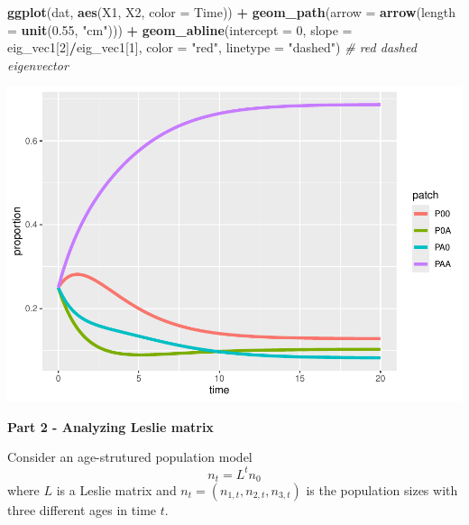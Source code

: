 \documentclass[
]{book}
\newenvironment{Shaded}{\begin{snugshade}}{\end{snugshade}}
\newcommand{\AttributeTok}[1]{\textcolor[rgb]{0.13,0.29,0.53}{#1}}
\newcommand{\CommentTok}[1]{\textcolor[rgb]{0.56,0.35,0.01}{\textit{#1}}}
\newcommand{\DecValTok}[1]{\textcolor[rgb]{0.00,0.00,0.81}{#1}}
\newcommand{\FloatTok}[1]{\textcolor[rgb]{0.00,0.00,0.81}{#1}}
\newcommand{\FunctionTok}[1]{\textcolor[rgb]{0.13,0.29,0.53}{\textbf{#1}}}
\newcommand{\NormalTok}[1]{#1}
\newcommand{\SpecialCharTok}[1]{\textcolor[rgb]{0.81,0.36,0.00}{\textbf{#1}}}
\newcommand{\StringTok}[1]{\textcolor[rgb]{0.31,0.60,0.02}{#1}}
\begin{document}
\begin{Shaded}
\begin{Highlighting}[]
\FunctionTok{ggplot}\NormalTok{(dat, }\FunctionTok{aes}\NormalTok{(X1, X2, }\AttributeTok{color =}\NormalTok{ Time)) }\SpecialCharTok{+}
  \FunctionTok{geom\_path}\NormalTok{(}\AttributeTok{arrow =} \FunctionTok{arrow}\NormalTok{(}\AttributeTok{length =} \FunctionTok{unit}\NormalTok{(}\FloatTok{0.55}\NormalTok{, }\StringTok{"cm"}\NormalTok{))) }\SpecialCharTok{+} 
  \FunctionTok{geom\_abline}\NormalTok{(}\AttributeTok{intercept =} \DecValTok{0}\NormalTok{, }
              \AttributeTok{slope =}\NormalTok{ eig\_vec1[}\DecValTok{2}\NormalTok{]}\SpecialCharTok{/}\NormalTok{eig\_vec1[}\DecValTok{1}\NormalTok{], }
              \AttributeTok{color =} \StringTok{"red"}\NormalTok{, }
              \AttributeTok{linetype =} \StringTok{"dashed"}\NormalTok{) }\CommentTok{\# red dashed eigenvector}
\end{Highlighting}
\end{Shaded}

\includegraphics{bookdown-demo_files/figure-latex/unnamed-chunk-17-1.pdf}

\textbf{Part 2 - Analyzing Leslie matrix}

Consider an age-strutured population model
\[
n_{t} = L^tn_0
\]
where \(L\) is a Leslie matrix and \(n_t = (n_{1,t}, n_{2,t}, n_{3,t})\) is the population sizes with three different ages in time \(t\).
\end{document}
